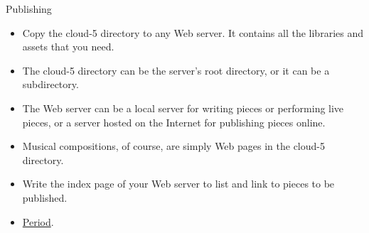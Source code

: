 \documentclass{beamer}
\begin{document}
\begin{frame}{Publishing}
\begin{itemize}
\item Copy the cloud-5 directory to any Web server. It contains all the libraries and assets that you need.
\item The cloud-5 directory can be the server's root directory, or it can be a subdirectory.
\item The Web server can be a local server for writing pieces or performing live pieces, or a server hosted on the Internet for publishing pieces online.
\item Musical compositions, of course, are simply Web pages in the cloud-5 directory.
\item Write the index page of your Web server to list and link to pieces to be published.
\item \href{https://gogins.github.io}{Period}.
\end{itemize}
\end{frame}
\end{document}
